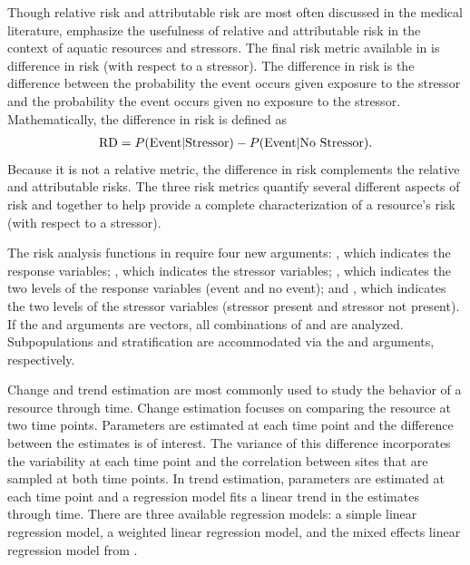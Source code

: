 \documentclass[
  shortnames]{jss}
\begin{document}
Though relative risk and attributable risk are most often discussed in
the medical literature, \citet{sickle2008assessing} emphasize the
usefulness of relative and attributable risk in the context of aquatic
resources and stressors. The final risk metric available in
 is difference in risk (with respect to a stressor). The
difference in risk is the difference between the probability the event
occurs given exposure to the stressor and the probability the event
occurs given no exposure to the stressor. Mathematically, the difference
in risk is defined as \begin{align}{\label{eq:rd}}
 \text{RD} = P(\text{Event} | \text{Stressor}) - P(\text{Event} | \text{No Stressor}) .
\end{align} Because it is not a relative metric, the difference in risk
complements the relative and attributable risks. The three risk metrics
quantify several different aspects of risk and together to help provide
a complete characterization of a resource's risk (with respect to a
stressor).

The risk analysis functions in  require four new
arguments: , which indicates the response variables;
, which indicates the stressor variables; \linebreak
{}, which indicates the two levels of the response
variables (event and no event); and , which
indicates the two levels of the stressor variables (stressor present and
stressor not present). If the  and
 arguments are vectors, all combinations of
 and  are analyzed.
Subpopulations and stratification are accommodated via the
 and  arguments, respectively.

Change and trend estimation are most commonly used to study the behavior
of a resource through time. Change estimation focuses on comparing the
resource at two time points. Parameters are estimated at each time point
and the difference between the estimates is of interest. The variance of
this difference incorporates the variability at each time point and the
correlation between sites that are sampled at both time points. In trend
estimation, parameters are estimated at each time point and a regression
model fits a linear trend in the estimates through time. There are three
available regression models: a simple linear regression model, a
weighted linear regression model, and the mixed effects linear
regression model from \citet{piepho2002simple}.
\end{document}
